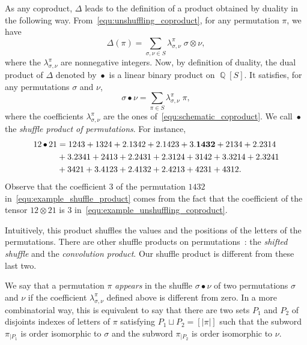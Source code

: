 \documentclass[a4paper,10pt]{llncs}
\DeclareMathOperator{\QQ}{\mathbb{Q}}
\DeclareMathOperator{\SHUFFLE}{\bullet}
\begin{document}
As any coproduct, $\Delta$ leads to the definition of a product obtained
by duality in the following way. From~\eqref{equ:unshuffling_coproduct},
for any permutation $\pi$, we have
\begin{equation} \label{equ:schematic_coproduct}
    \Delta(\pi) =
    \sum_{\sigma, \nu \in S} \lambda_{\sigma, \nu}^\pi \;
    \sigma \otimes \nu,
\end{equation}
where the $\lambda_{\sigma, \nu}^\pi$ are nonnegative integers. Now,
by definition of duality, the dual product of $\Delta$ denoted by
$\SHUFFLE$ is a linear binary product on $\QQ[S]$. It satisfies, for any
permutations
$\sigma$ and $\nu$,
\begin{equation}
    \sigma \SHUFFLE \nu =
    \sum_{\pi \in S}
    \lambda_{\sigma, \nu}^\pi \; \pi,
\end{equation}
where the coefficients $\lambda_{\sigma, \nu}^\pi$ are the ones
of~\eqref{equ:schematic_coproduct}. We call $\SHUFFLE$ the
{\em shuffle product of permutations}. For instance,
\begin{equation}\begin{split} \label{equ:example_shuffle_product}
    12 \SHUFFLE 21 & =
    1243 + 1324 + 2.1342 + 2.1423 + 3. {\bf 1432} + 2134 + 2.2314 \\
    & + 3.2341 + 2413 + 2.2431 + 2.3124 + 3142 + 3.3214 + 2.3241 \\
    & + 3421 + 3.4123 + 2.4132 + 2.4213 + 4231 + 4312.
\end{split}\end{equation}
Observe that the coefficient $3$ of the permutation $1432$
in~\eqref{equ:example_shuffle_product} comes from the fact that the
coefficient of the tensor $12 \otimes 21$ is $3$
in~\eqref{equ:example_unshuffling_coproduct}.
\medskip

Intuitively, this product shuffles the values and the positions of the
letters of the permutations. There are other shuffle products on
permutations~\cite{DHT:IJAC:2002}: the {\em shifted shuffle} and the
{\em convolution product}. Our shuffle product is different from these
last two.
\medskip

We say that a permutation $\pi$ {\em appears} in the shuffle
$\sigma \SHUFFLE \nu$ of two permutations $\sigma$ and $\nu$ if the
coefficient $\lambda_{\sigma, \nu}^\pi$ defined above is different from
zero. In a more combinatorial way, this is equivalent to say that there
are two sets $P_1$ and $P_2$ of disjoints indexes of letters of $\pi$
satisfying $P_1 \sqcup P_2 = [|\pi|]$ such that the subword $\pi_{|P_1}$
is order isomorphic to $\sigma$ and the subword $\pi_{|P_2}$ is order
isomorphic to $\nu$.
\medskip
\end{document}
